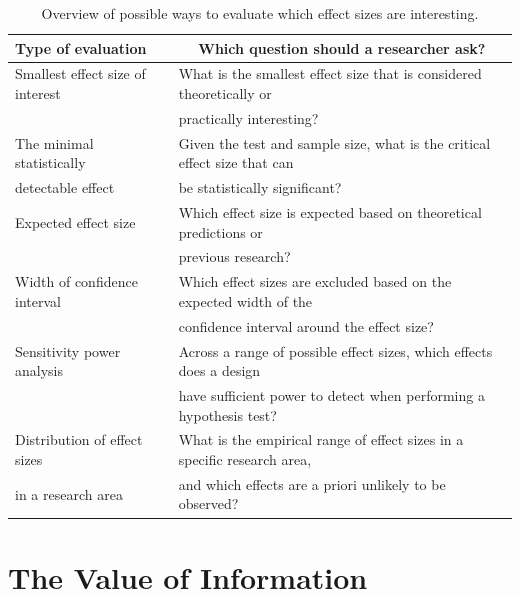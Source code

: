 \documentclass[
  english,
  ,jou,floatsintext]{apa6}
\begin{document}
\begin{table}[tbp]

\begin{center}
\begin{threeparttable}

\caption{\label{tab:table-effect-eval}Overview of possible ways to evaluate which effect sizes are interesting.}

\begin{tabular}{ll}
\toprule
Type of evaluation & \multicolumn{1}{c}{Which question should a researcher ask?}\\
\midrule
Smallest effect size of interest & What is the smallest effect size that is considered theoretically or\\
 & practically interesting?\\ \midrule
The minimal statistically & Given the test and sample size, what is the critical effect size that can\\
detectable effect & be statistically significant?\\ \midrule
Expected effect size & Which effect size is expected based on theoretical predictions or\\
 & previous research?\\ \midrule
Width of confidence interval & Which effect sizes are excluded based on the expected width of the\\
 & confidence interval around the effect size?\\ \midrule
Sensitivity power analysis & Across a range of possible effect sizes, which effects does a design\\
 & have sufficient power to detect when performing a hypothesis test?\\ \midrule
Distribution of effect sizes & What is the empirical range of effect sizes in a specific research area,\\
in a research area & and which effects are a priori unlikely to be observed?\\
\bottomrule
\end{tabular}

\end{threeparttable}
\end{center}

\end{table}

\hypertarget{the-value-of-information}{%
\section{The Value of Information}\label{the-value-of-information}}
\end{document}
